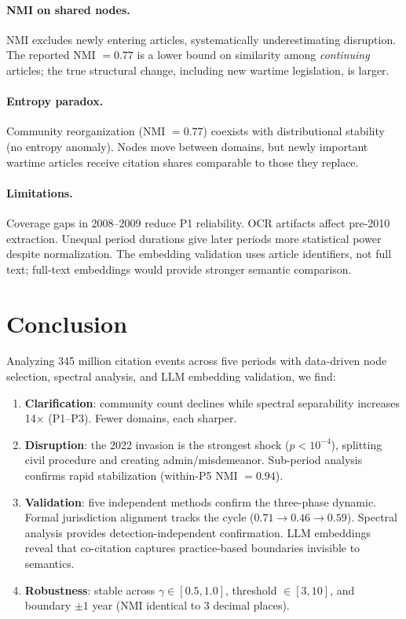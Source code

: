 \documentclass[11pt]{article}
\begin{document}
\paragraph{NMI on shared nodes.}
NMI excludes newly entering articles, systematically underestimating disruption.
The reported NMI $= 0.77$ is a lower bound on similarity among \emph{continuing} articles; the true structural change, including new wartime legislation, is larger.

\paragraph{Entropy paradox.}
Community reorganization (NMI $= 0.77$) coexists with distributional stability (no entropy anomaly).
Nodes move between domains, but newly important wartime articles receive citation shares comparable to those they replace.

\paragraph{Limitations.}
Coverage gaps in 2008--2009 reduce P1 reliability.
OCR artifacts affect pre-2010 extraction.
Unequal period durations give later periods more statistical power despite normalization.
The embedding validation uses article identifiers, not full text; full-text embeddings would provide stronger semantic comparison.

\section{Conclusion}
\label{sec:conclusion}

Analyzing 345 million citation events across five periods with data-driven node selection, spectral analysis, and LLM embedding validation, we find:

\begin{enumerate}[nosep]
  \item \textbf{Clarification}: community count declines while spectral separability increases 14$\times$ (P1--P3). Fewer domains, each sharper.
  \item \textbf{Disruption}: the 2022 invasion is the strongest shock ($p < 10^{-4}$), splitting civil procedure and creating admin/misdemeanor. Sub-period analysis confirms rapid stabilization (within-P5 NMI $= 0.94$).
  \item \textbf{Validation}: five independent methods confirm the three-phase dynamic. Formal jurisdiction alignment tracks the cycle ($0.71 \to 0.46 \to 0.59$). Spectral analysis provides detection-independent confirmation. LLM embeddings reveal that co-citation captures practice-based boundaries invisible to semantics.
  \item \textbf{Robustness}: stable across $\gamma \in [0.5, 1.0]$, threshold $\in [3, 10]$, and boundary $\pm 1$ year (NMI identical to 3 decimal places).
\end{enumerate}
\end{document}
